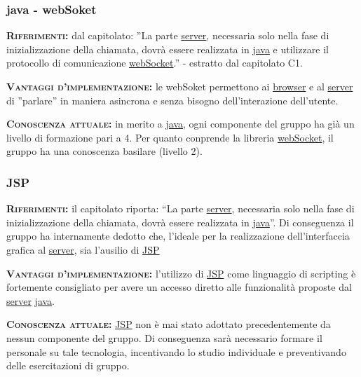 \subsubsection{java - webSoket}
\begin{description}
	\item{\scshape\bfseries Riferimenti:} dal capitolato: ''La parte \underline{server}, necessaria solo nella fase di inizializzazione della chiamata, dovrà essere realizzata in \underline{java} e utilizzare il protocollo di comunicazione \underline{webSocket}.'' - estratto dal capitolato C1.
	
	\item{\scshape\bfseries Vantaggi d'implementazione:} le webSoket permettono ai \underline{browser} e al \underline{server} di ''parlare'' in maniera asincrona e senza bisogno dell'interazione dell'utente.

	\item{\scshape\bfseries Conoscenza attuale:} in merito a \underline{java}, ogni componente del gruppo ha già un livello di formazione pari a 4. Per quanto conprende la libreria  \underline{webSocket}, il gruppo ha una conoscenza basilare (livello 2).  
\end{description}
\subsubsection{JSP}
\begin{description}
	\item{\scshape\bfseries Riferimenti:} il capitolato riporta: ``La parte \underline{server}, necessaria solo nella fase di inizializzazione della chiamata, dovrà essere realizzata in \underline{java}''. Di conseguenza il gruppo ha internamente dedotto che, l'ideale per la realizzazione dell'interfaccia grafica al \underline{server}, sia l'ausilio di \underline{JSP}
	
	\item{\scshape\bfseries Vantaggi d'implementazione:} l'utilizzo di \underline{JSP} come linguaggio di scripting è fortemente consigliato per avere un accesso diretto alle funzionalità proposte dal \underline{server} \underline{java}.

	\item{\scshape\bfseries Conoscenza attuale:} \underline{JSP} non è mai stato adottato precedentemente da nessun componente del gruppo. Di conseguenza sarà necessario formare il personale su tale tecnologia, incentivando lo studio individuale e preventivando delle esercitazioni di gruppo.
\end{description}

